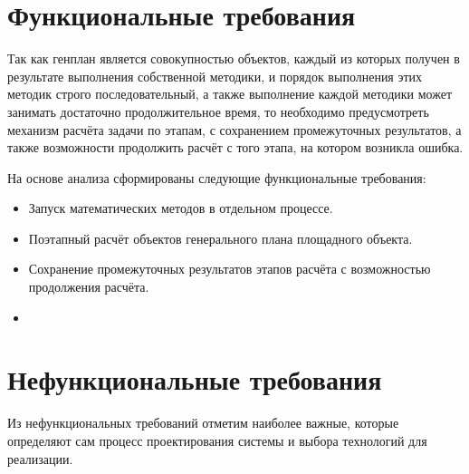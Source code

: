 \section{\Large{Функциональные требования}}



Так как генплан является совокупностью объектов, каждый из которых получен в результате выполнения
собственной методики, и порядок выполнения этих методик строго последовательный, а также выполнение
каждой методики может занимать достаточно продолжительное время, то необходимо предусмотреть
механизм расчёта задачи по этапам, с сохранением промежуточных результатов,
а также возможности продолжить расчёт с того этапа, на котором возникла ошибка.





На основе анализа сформированы следующие функциональные требования:
\begin{itemize}
    \item {
        Запуск математических методов в отдельном процессе.
    }
    \item {
        Поэтапный расчёт объектов генерального плана площадного объекта.
    }
    \item {
        Сохранение промежуточных результатов этапов расчёта с возможностью продолжения расчёта.
    }
    \item {

    }
\end{itemize}

\section{\large{Нефункциональные требования}}

Из нефункциональных требований отметим наиболее важные, которые определяют сам процесс проектирования системы
и выбора технологий для реализации.

